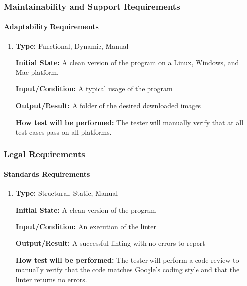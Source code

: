 \documentclass[12pt, titlepage]{article}
\begin{document}
\subsubsection{Maintainability and Support Requirements}
		
\paragraph{Adaptability Requirements}

\begin{enumerate}[label=NFR-ADR\arabic*:, wide=0pt, leftmargin=*]

\item \phantom{empty}

\textbf{Type:} Functional, Dynamic, Manual
					
\textbf{Initial State:} A clean version of the program on a Linux, Windows, and Mac platform.
					
\textbf{Input/Condition:} A typical usage of the program
					
\textbf{Output/Result:} A folder of the desired downloaded images
					
\textbf{How test will be performed:} The tester will manually verify that at all test cases pass on all platforms.

\end{enumerate}

\subsubsection{Legal Requirements}
		
\paragraph{Standards Requirements}

\begin{enumerate}[label=NFR-SR\arabic*:, wide=0pt, leftmargin=*]

\item \phantom{empty}

\textbf{Type:} Structural, Static, Manual
					
\textbf{Initial State:} A clean version of the program
					
\textbf{Input/Condition:} An execution of the linter
					
\textbf{Output/Result:} A successful linting with no errors to report
					
\textbf{How test will be performed:} The tester will perform a code review to manually verify that the code matches Google's coding style and that the linter returns no errors.

\end{enumerate}
\newpage
\end{document}
